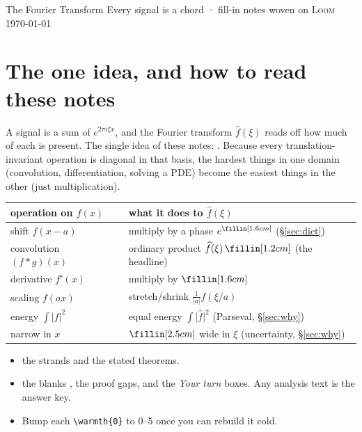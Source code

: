 \documentclass{loom}
\newcommand{\abs}[1]{\lvert #1\rvert}
\begin{document}
\loomcover
  {The Fourier Transform}
  {Every signal is a chord · fill-in notes}
  {woven on \textsc{Loom}}
  {\today}

\section*{The one idea, and how to read these notes}

\begin{strand}
A signal is a sum of  $e^{2\pi i\xi x}$, and the Fourier transform
$\widehat f(\xi)$ reads off how much of each is present. The single idea of these notes:
. Because every translation-invariant
operation is diagonal in that basis, the hardest things in one domain (convolution,
differentiation, solving a PDE) become the easiest things in the other (just multiplication).
\end{strand}

\noindent\begin{tabularx}{\linewidth}{@{}L L@{}}
\toprule
{\color{indigo}operation on $f(x)$} & {\color{madder}what it does to $\widehat f(\xi)$}\\
\midrule
shift $f(x-a)$                & multiply by a phase $e^{\fillin[1.6cm]}$ \;(§\ref{sec:dict})\\
convolution $(f*g)(x)$        & ordinary product $\widehat f(\xi)\,\fillin[1.2cm]$ \;(the headline)\\
derivative $f'(x)$            & multiply by $\fillin[1.6cm]$\\
scaling $f(ax)$              & stretch/shrink $\tfrac{1}{\abs a}\widehat f(\xi/a)$\\
energy $\int\abs{f}^2$        & equal energy $\int\abs{\widehat f}^2$ \;(Parseval, §\ref{sec:why})\\
narrow in $x$               & $\fillin[2.5cm]$ wide in $\xi$ \;(uncertainty, §\ref{sec:why})\\
\bottomrule
\end{tabularx}

\begin{itemize}[leftmargin=1.3em,itemsep=1pt]
  \item {} the strands and the stated theorems.
  \item {} the blanks \fillin[1.2cm], the  proof gaps, and the
        \emph{Your turn} boxes. Any analysis text is the answer key.
  \item Bump each \texttt{\textbackslash warmth\{0\}} to $0$--$5$ once you can rebuild it cold.
\end{itemize}

\bigskip
{\small\tableofcontents}

\clearpage




\end{document}
